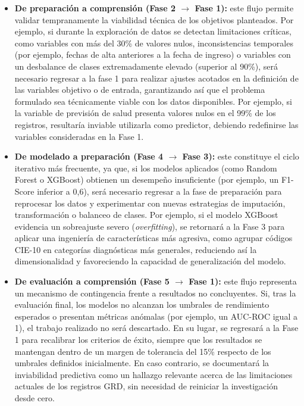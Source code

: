 \begin{itemize}

\item \textbf{De preparación a comprensión (Fase 2 $\rightarrow$ Fase 1):} este flujo permite validar tempranamente la viabilidad técnica de los objetivos planteados. Por ejemplo, si durante la exploración de datos se detectan limitaciones críticas, como variables con más del 30\% de valores nulos, inconsistencias temporales (por ejemplo, fechas de alta anteriores a la fecha de ingreso) o variables con un desbalance de clases extremadamente elevado (superior al 90\%), será necesario regresar a la fase 1 para realizar ajustes acotados en la definición de las variables objetivo o de entrada, garantizando así que el problema formulado sea técnicamente viable con los datos disponibles. Por ejemplo, si la variable de previsión de salud presenta valores nulos en el 99\% de los registros, resultaría inviable utilizarla como predictor, debiendo redefinirse las variables consideradas en la Fase 1.

\item \textbf{De modelado a preparación (Fase 4 $\rightarrow$ Fase 3):} este constituye el ciclo iterativo más frecuente, ya que, si los modelos aplicados (como Random Forest o XGBoost) obtienen un desempeño insuficiente (por ejemplo, un F1-Score inferior a 0,6), será necesario regresar a la fase de preparación para reprocesar los datos y experimentar con nuevas estrategias de imputación, transformación o balanceo de clases. Por ejemplo, si el modelo XGBoost evidencia un sobreajuste severo (\textit{overfitting}), se retornará a la Fase 3 para aplicar una ingeniería de características más agresiva, como agrupar códigos CIE-10 en categorías diagnósticas más generales, reduciendo así la dimensionalidad y favoreciendo la capacidad de generalización del modelo.

\item \textbf{De evaluación a comprensión (Fase 5 $\rightarrow$ Fase 1):} este flujo representa un mecanismo de contingencia frente a resultados no concluyentes. Si, tras la evaluación final, los modelos no alcanzan los umbrales de rendimiento esperados o presentan métricas anómalas (por ejemplo, un AUC-ROC igual a 1), el trabajo realizado no será descartado. En su lugar, se regresará a la Fase 1 para recalibrar los criterios de éxito, siempre que los resultados se mantengan dentro de un margen de tolerancia del 15\% respecto de los umbrales definidos inicialmente. En caso contrario, se documentará la inviabilidad predictiva como un hallazgo relevante acerca de las limitaciones actuales de los registros GRD, sin necesidad de reiniciar la investigación desde cero.


\end{itemize}

